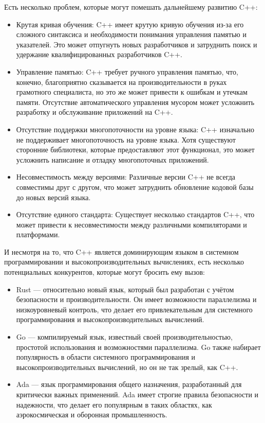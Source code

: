 Есть несколько проблем, которые могут помешать дальнейшему развитию C++:
\begin{itemize}
    \item Крутая кривая обучения: C++ имеет крутую кривую обучения из-за его сложного синтаксиса и необходимости понимания управления памятью и указателей. Это может отпугнуть новых разработчиков и затруднить поиск и удержание квалифицированных разработчиков C++.
    \item Управление памятью: C++ требует ручного управления памятью, что, конечно, благоприятно сказывается на производительности в руках грамотного специалиста, но это же может привести к ошибкам и утечкам памяти. Отсутствие автоматического управления мусором может усложнить разработку и обслуживание приложений на C++.
    \item Отсутствие поддержки многопоточности на уровне языка: C++ изначально не поддерживает многопоточность на уровне языка. Хотя существуют сторонние библиотеки, которые предоставляют этот функционал, это может усложнить написание и отладку многопоточных приложений.
    \item Несовместимость между версиями: Различные версии C++ не всегда совместимы друг с другом, что может затруднить обновление кодовой базы до новых версий языка.
    \item Отсутствие единого стандарта: Существует несколько стандартов C++, что может привести к несовместимости между различными компиляторами и платформами.
\end{itemize}

И несмотря на то, что C++ является доминирующим языком в системном программировании и высокопроизводительных вычислениях, есть несколько потенциальных конкурентов,  которые могут бросить ему вызов:
\begin{itemize}
    \item Rust --- относительно новый язык, который был разработан с учётом безопасности и производительности. Он имеет возможности параллелизма и низкоуровневый контроль, что делает его привлекательным для системного программирования и высокопроизводительных вычислений.
    \item Go --- компилируемый язык, известный своей производительностью, простотой использования и возможностями параллелизма. Go также набирает популярность в области системного программирования и высокопроизводительных вычислений, но он не так зрелый, как C++.
    \item Ada --- язык программирования общего назначения, разработанный для критически важных применений. Ada имеет строгие правила безопасности и надежности, что делает его популярным в таких областях, как аэрокосмическая и оборонная промышленность.
\end{itemize}

